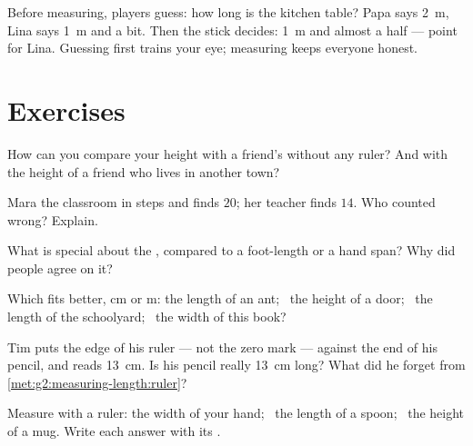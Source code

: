 \begin{example}\label{ex:g2:measuring-length:estimate}
Before measuring, players guess: how long is the kitchen table?
Papa says \qty{2}{m}, Lina says \qty{1}{m} and a bit. Then the 
stick decides: \qty{1}{m} and almost a half --- point for Lina.
Guessing first trains your eye; measuring keeps everyone honest.
\end{example}

\section{Exercises}

\begin{exercise}[$\star$]\label{exo:g2:measuring-length:1}
How can you compare your height with a friend's without any ruler?
And with the height of a friend who lives in another town?
\end{exercise}

\begin{exercise}[$\star$]\label{exo:g2:measuring-length:2}
Mara  the classroom in steps and finds $20$; her teacher
finds $14$. Who counted wrong? Explain.
\end{exercise}

\begin{exercise}[$\star$]\label{exo:g2:measuring-length:3}
What is special about the , compared to a foot-length or a
hand span? Why did people agree on it?
\end{exercise}

\begin{exercise}[$\star$]\label{exo:g2:measuring-length:4}
Which  fits better, \unit{cm} or \unit{m}: the length of an ant;
\ the height of a door; \ the length of the schoolyard; \ the width
of this book?
\end{exercise}

\begin{exercise}[$\star$]\label{exo:g2:measuring-length:5}
Tim puts the edge of his ruler --- not the zero mark --- against the
end of his pencil, and reads \qty{13}{cm}. Is his pencil really
\qty{13}{cm} long? What did he forget from
\cref{met:g2:measuring-length:ruler}?
\end{exercise}

\begin{exercise}[$\star$]\label{exo:g2:measuring-length:6}
Measure with a ruler: the width of your hand; \ the length of a
spoon; \ the height of a mug. Write each answer with its .
\end{exercise}

